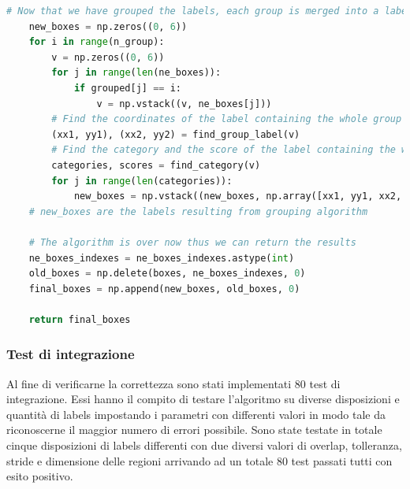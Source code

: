 \begin{lstlisting}[language=Python, caption=Python example]
    # Now that we have grouped the labels, each group is merged into a label containing all of them
    new_boxes = np.zeros((0, 6))
    for i in range(n_group):
        v = np.zeros((0, 6))
        for j in range(len(ne_boxes)):
            if grouped[j] == i:
                v = np.vstack((v, ne_boxes[j]))
        # Find the coordinates of the label containing the whole group
        (xx1, yy1), (xx2, yy2) = find_group_label(v)
        # Find the category and the score of the label containing the whole group
        categories, scores = find_category(v)
        for j in range(len(categories)):
            new_boxes = np.vstack((new_boxes, np.array([xx1, yy1, xx2, yy2, categories[j], scores[j]])))
    # new_boxes are the labels resulting from grouping algorithm

    # The algorithm is over now thus we can return the results
    ne_boxes_indexes = ne_boxes_indexes.astype(int)
    old_boxes = np.delete(boxes, ne_boxes_indexes, 0)
    final_boxes = np.append(new_boxes, old_boxes, 0)

    return final_boxes
\end{lstlisting}
\subsubsection{Test di integrazione}
Al fine di verificarne la correttezza sono stati implementati 80 test di integrazione. Essi hanno il compito di testare l'algoritmo su diverse disposizioni e quantità di labels impostando i parametri con differenti valori in modo tale da riconoscerne il maggior numero di errori possibile. Sono state testate in totale cinque disposizioni di labels differenti con due diversi valori di overlap, tolleranza, stride e dimensione delle regioni arrivando ad un totale 80 test passati tutti con esito positivo.
